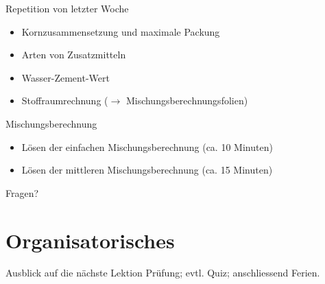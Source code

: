 \begin{frame}{Repetition von letzter Woche}
    \begin{itemize}
        \item[\textbullet]  Kornzusammensetzung und maximale Packung
        \item[\textbullet]  Arten von Zusatzmitteln
        \item[\textbullet]  Wasser-Zement-Wert
        \item[\textbullet]  Stoffraumrechnung ($\rightarrow$ Mischungsberechnungsfolien) 
    \end{itemize}

\end{frame}

\begin{frame}{Mischungsberechnung}
	\begin{itemize}
		\item[\textbullet] Lösen der einfachen Mischungsberechnung (ca. 10 Minuten)
		\item[\textbullet] Lösen der mittleren Mischungsberechnung (ca. 15 Minuten)
	\end{itemize}
\end{frame}

\begin{frame}{Fragen?}

\end{frame}


\section{Organisatorisches}
\BlueSectionSlide





\begin{frame}{Ausblick auf die nächste Lektion}
   Prüfung; evtl. Quiz; anschliessend Ferien.

\end{frame}


